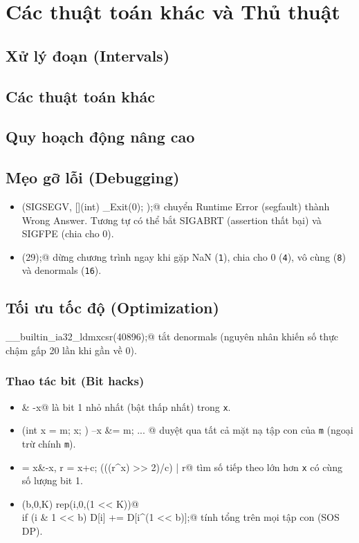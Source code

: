 \chapter{Các thuật toán khác và Thủ thuật}

\section{Xử lý đoạn (Intervals)}

\section{Các thuật toán khác}

\section{Quy hoạch động nâng cao}

\section{Mẹo gỡ lỗi (Debugging)}
	\begin{itemize}
		\item \verb@signal(SIGSEGV, [](int) { _Exit(0); });@ chuyển Runtime Error (segfault) thành Wrong Answer.
			Tương tự có thể bắt SIGABRT (assertion thất bại) và SIGFPE (chia cho 0).
		\item \verb@feenableexcept(29);@ dừng chương trình ngay khi gặp NaN (\texttt 1), chia cho 0 (\texttt 4), vô cùng (\texttt 8) và denormals (\texttt{16}).
	\end{itemize}

\section{Tối ưu tốc độ (Optimization)}
	\verb@__builtin_ia32_ldmxcsr(40896);@ tắt denormals (nguyên nhân khiến số thực chậm gấp 20 lần khi gần về 0).
	\subsection{Thao tác bit (Bit hacks)}
		\begin{itemize}
			\item \verb@x & -x@ là bit 1 nhỏ nhất (bật thấp nhất) trong \texttt{x}.
			\item \verb@for (int x = m; x; ) { --x &= m; ... }@ duyệt qua tất cả mặt nạ tập con của \texttt{m} (ngoại trừ chính \texttt{m}).
			\item \verb@c = x&-x, r = x+c; (((r^x) >> 2)/c) | r@ tìm số tiếp theo lớn hơn \texttt{x} có cùng số lượng bit 1.
			\item \verb@rep(b,0,K) rep(i,0,(1 << K))@ \\ \verb@  if (i & 1 << b) D[i] += D[i^(1 << b)];@ tính tổng trên mọi tập con (SOS DP).
		\end{itemize}

